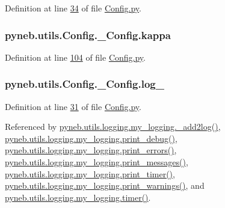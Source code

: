 Definition at line \hyperlink{_config_8py_source_l00034}{34} of file \hyperlink{_config_8py_source}{Config.\-py}.

\hypertarget{classpyneb_1_1utils_1_1_config_1_1___config_a753691b738e636f400f909260d23c6eb}{
\subsubsection[{kappa}]{\setlength{\rightskip}{0pt plus 5cm}pyneb.\-utils.\-Config.\-\_\-\-Config.\-kappa}}\label{classpyneb_1_1utils_1_1_config_1_1___config_a753691b738e636f400f909260d23c6eb}


Definition at line \hyperlink{_config_8py_source_l00104}{104} of file \hyperlink{_config_8py_source}{Config.\-py}.

\hypertarget{classpyneb_1_1utils_1_1_config_1_1___config_a8304de6467642234fcf5a7ae1e7a16bd}{
\subsubsection[{log\-\_\-}]{\setlength{\rightskip}{0pt plus 5cm}pyneb.\-utils.\-Config.\-\_\-\-Config.\-log\-\_\-}}\label{classpyneb_1_1utils_1_1_config_1_1___config_a8304de6467642234fcf5a7ae1e7a16bd}


Definition at line \hyperlink{_config_8py_source_l00031}{31} of file \hyperlink{_config_8py_source}{Config.\-py}.



Referenced by \hyperlink{logging_8py_source_l00059}{pyneb.\-utils.\-logging.\-my\-\_\-logging.\-\_\-add2log()}, \hyperlink{logging_8py_source_l00157}{pyneb.\-utils.\-logging.\-my\-\_\-logging.\-print\-\_\-debug()}, \hyperlink{logging_8py_source_l00149}{pyneb.\-utils.\-logging.\-my\-\_\-logging.\-print\-\_\-errors()}, \hyperlink{logging_8py_source_l00133}{pyneb.\-utils.\-logging.\-my\-\_\-logging.\-print\-\_\-messages()}, \hyperlink{logging_8py_source_l00165}{pyneb.\-utils.\-logging.\-my\-\_\-logging.\-print\-\_\-timer()}, \hyperlink{logging_8py_source_l00141}{pyneb.\-utils.\-logging.\-my\-\_\-logging.\-print\-\_\-warnings()}, and \hyperlink{logging_8py_source_l00115}{pyneb.\-utils.\-logging.\-my\-\_\-logging.\-timer()}.

